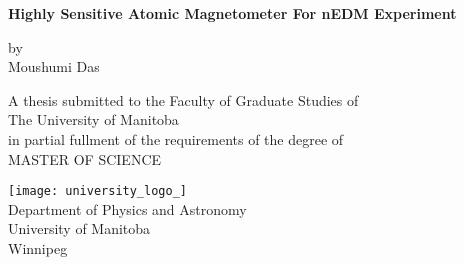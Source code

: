 \documentclass[12pt]{report}
\begin{document}
\begin{titlepage}
    \begin{center}
        \vspace*{0.5cm}
        
        \large
        \textbf{Highly Sensitive Atomic Magnetometer For nEDM Experiment }
        
        \vspace{0.5cm}
        \large
        
        
        \vspace{1.5cm}
        by\\
        \vspace{0.9cm}
        Moushumi Das
        \vfill
        
%
       \vspace{1.5cm}
       A thesis submitted to the Faculty of Graduate Studies of\\ The University of Manitoba\\
       in partial fullment of the requirements of the degree of\\
        \vspace{1.2cm}
        MASTER OF SCIENCE
        \Large
        \vspace{0.8cm}
        
        \texttt{[image: university\_logo\_]}\\
        \large
        Department of Physics and Astronomy\\
        University of Manitoba\\
        Winnipeg
  
        
    \end{center}
\end{titlepage}
\end{document}
